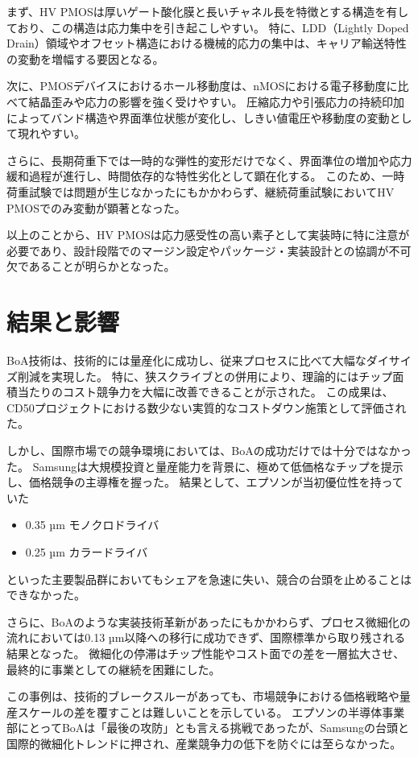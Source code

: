 \documentclass[conference]{IEEEtran}
\begin{document}
まず、HV PMOSは厚いゲート酸化膜と長いチャネル長を特徴とする構造を有しており、この構造は応力集中を引き起こしやすい。  
特に、LDD（Lightly Doped Drain）領域やオフセット構造における機械的応力の集中は、キャリア輸送特性の変動を増幅する要因となる。  

次に、PMOSデバイスにおけるホール移動度は、nMOSにおける電子移動度に比べて結晶歪みや応力の影響を強く受けやすい。  
圧縮応力や引張応力の持続印加によってバンド構造や界面準位状態が変化し、しきい値電圧や移動度の変動として現れやすい。  

さらに、長期荷重下では一時的な弾性的変形だけでなく、界面準位の増加や応力緩和過程が進行し、時間依存的な特性劣化として顕在化する。  
このため、一時荷重試験では問題が生じなかったにもかかわらず、継続荷重試験においてHV PMOSでのみ変動が顕著となった。  

以上のことから、HV PMOSは応力感受性の高い素子として実装時に特に注意が必要であり、設計段階でのマージン設定やパッケージ・実装設計との協調が不可欠であることが明らかとなった。

\section{結果と影響}
BoA技術は、技術的には量産化に成功し、従来プロセスに比べて大幅なダイサイズ削減を実現した。  
特に、狭スクライブとの併用により、理論的にはチップ面積当たりのコスト競争力を大幅に改善できることが示された。  
この成果は、CD50プロジェクトにおける数少ない実質的なコストダウン施策として評価された。

しかし、国際市場での競争環境においては、BoAの成功だけでは十分ではなかった。  
Samsungは大規模投資と量産能力を背景に、極めて低価格なチップを提示し、価格競争の主導権を握った。  
結果として、エプソンが当初優位性を持っていた
\begin{itemize}
  \item 0.35 µm モノクロドライバ
  \item 0.25 µm カラードライバ
\end{itemize}
といった主要製品群においてもシェアを急速に失い、競合の台頭を止めることはできなかった。

さらに、BoAのような実装技術革新があったにもかかわらず、プロセス微細化の流れにおいては0.13 µm以降への移行に成功できず、国際標準から取り残される結果となった。  
微細化の停滞はチップ性能やコスト面での差を一層拡大させ、最終的に事業としての継続を困難にした。

この事例は、技術的ブレークスルーがあっても、市場競争における価格戦略や量産スケールの差を覆すことは難しいことを示している。  
エプソンの半導体事業部にとってBoAは「最後の攻防」とも言える挑戦であったが、Samsungの台頭と国際的微細化トレンドに押され、産業競争力の低下を防ぐには至らなかった。
\end{document}
